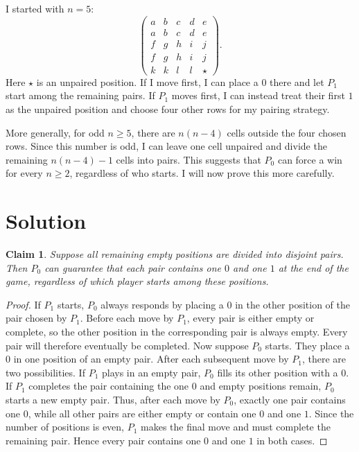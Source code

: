 \documentclass[11pt]{article}
\newcommand{\keywordfont}{\textsc}
\newcommand{\keyword}[1]{%
  \marginpar{\raggedright\small\keywordfont{#1}}}
\newtheorem{claim}{Claim}
\begin{document}
\keyword{ATTEMPT} I started with $n=5$:
$$
\begin{pmatrix}
a&b&c&d&e\\
a&b&c&d&e\\
f&g&h&i&j\\
f&g&h&i&j\\
k&k&l&l&\star
\end{pmatrix}.
$$
Here $\star$ is an unpaired position. If I move first, I can place a $0$ there and let $P_1$ start among the remaining pairs. If $P_1$ moves first, I can instead treat their first $1$ as the unpaired position and choose four other rows for my pairing strategy.

\keyword{AHA} More generally, for odd $n\geq5$, there are $n(n-4)$ cells outside the four chosen rows. Since this number is odd, I can leave one cell unpaired and divide the remaining $n(n-4)-1$ cells into pairs. This suggests that $P_0$ can force a win for every $n\geq2$, regardless of who starts. I will now prove this more carefully.

\section{Solution}

\begin{claim}
Suppose all remaining empty positions
are divided into disjoint pairs. Then $P_0$ can guarantee that each pair contains one $0$ and one $1$ at the end of the game, regardless of which player starts among these positions.
\end{claim}

\begin{proof}
If $P_1$ starts, $P_0$ always responds by placing a $0$ in the other position of the pair chosen by $P_1$. Before each move by $P_1$, every pair is either empty or complete, so the other position in the corresponding pair is always empty. Every pair will therefore eventually be completed.
Now suppose $P_0$ starts. They place a $0$ in one position of an empty pair. After each subsequent move by $P_1$, there are two possibilities. If $P_1$ plays in an empty pair, $P_0$ fills its other position with a $0$. If $P_1$ completes the pair containing
the one $0$ and empty positions remain,
$P_0$ starts a new empty pair.
Thus, after each move by $P_0$, exactly one pair contains one $0$, while all other pairs are either empty or contain one $0$ and one $1$. Since the number of positions is even, $P_1$ makes the final move and must complete the remaining pair. Hence every pair contains one $0$ and one $1$ in both cases.
\end{proof}
\end{document}
